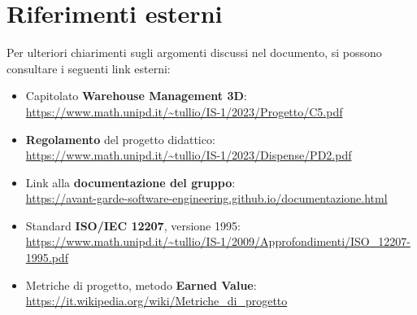 \section{Riferimenti esterni} \label{sec:riferimenti_esterni}
Per ulteriori chiarimenti sugli argomenti discussi nel documento, si possono consultare i seguenti link esterni:
\begin{itemize}
    \item Capitolato \textbf{Warehouse Management 3D}:\\
    \url{https://www.math.unipd.it/~tullio/IS-1/2023/Progetto/C5.pdf}
    \item \textbf{Regolamento} del progetto didattico:\\
    \url{https://www.math.unipd.it/~tullio/IS-1/2023/Dispense/PD2.pdf}
    \item Link alla \textbf{documentazione del gruppo}:\\
    \url{https://avant-garde-software-engineering.github.io/documentazione.html}
    \item Standard \textbf{ISO/IEC 12207}, versione 1995:\\
    \url{https://www.math.unipd.it/~tullio/IS-1/2009/Approfondimenti/ISO_12207-1995.pdf}
    \item Metriche di progetto, metodo \textbf{Earned Value}:\\
    \url{https://it.wikipedia.org/wiki/Metriche_di_progetto}
\end{itemize}